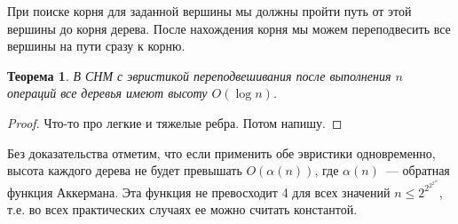\documentclass[12pt]{article}
\newtheorem*{theorem*}{Теорема}
\renewcommand{\leq}{\leqslant}
\begin{document}
При поиске корня для заданной вершины мы должны пройти путь от этой вершины до корня дерева. После нахождения корня мы можем переподвесить все вершины на пути сразу к корню.

\begin{theorem*}

В СНМ с эвристикой переподвешивания после выполнения $n$ операций все деревья имеют высоту $O(\log n)$.

\end{theorem*}

\begin{proof}

Что-то про легкие и тяжелые ребра. Потом напишу.

\end{proof}

Без доказательства отметим, что если применить обе эвристики одновременно, высота каждого дерева не будет превышать $O(\alpha(n))$, где $\alpha(n)$~--- обратная функция Аккермана. Эта функция не превосходит 4 для всех значений $n \leq 2^{2^{2^{2^{16}}}}$, т.е. во всех практических случаях ее можно считать константой.
\end{document}
